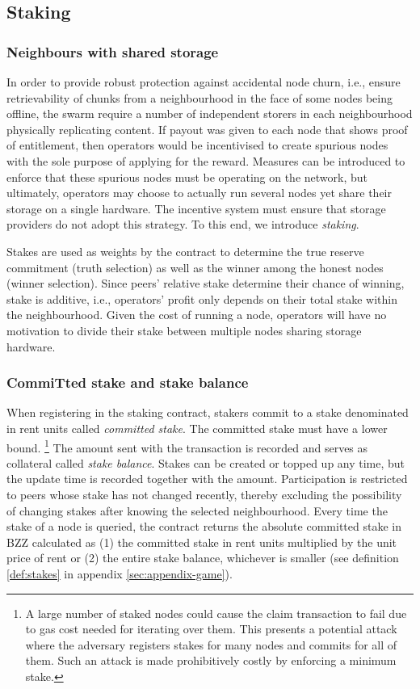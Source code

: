 \subsection{Staking}\label{sec:staking}

\subsubsection{Neighbours with shared storage}

In order to provide robust protection against accidental node churn, i.e., ensure retrievability of chunks from a neighbourhood in the face of some nodes being offline, the swarm require a number of independent storers in each neighbourhood physically replicating content.
If payout was given to each node that shows proof of entitlement, then operators would be incentivised to create spurious nodes with the sole purpose of applying for the reward. Measures can be introduced to enforce that these spurious nodes must be operating on the network, but ultimately, operators may choose to actually run several nodes yet share their storage on a single hardware. 
The incentive system must ensure that storage providers do not  adopt this strategy. To this end, we introduce \emph{staking}.  

Stakes are used as weights by the contract to determine the true reserve commitment (truth selection) as well as the winner among the honest nodes (winner selection). Since peers' relative stake determine their chance of winning, stake is additive, i.e., operators' profit only depends on their total stake within the neighbourhood. Given the cost of running a node, operators will have no  motivation to divide their stake between multiple nodes sharing storage hardware.



\subsubsection{CommiTted stake and stake balance}

When registering in the staking contract, stakers commit to a stake denominated in rent units called 
\emph{committed stake}.  The committed stake must have a lower bound.%
%
\footnote{A large number of staked nodes could cause the claim transaction to fail due to gas cost needed for iterating over them. This presents a potential attack where the adversary registers stakes for many nodes and commits for all of them. Such an attack is made prohibitively costly by enforcing a minimum stake.}
%
The  amount sent with the transaction is recorded and serves as collateral called \emph{stake balance}. Stakes can be created or topped up any time, but the update time is recorded together with the amount.
Participation is restricted to peers whose stake has not changed recently, thereby excluding the possibility of changing stakes after knowing the selected neighbourhood.
Every time the stake of a node is queried, the contract returns  the  absolute committed stake in BZZ calculated as (1) the committed stake in rent units multiplied by the unit price of rent  or (2) the entire stake balance, whichever is smaller (see definition \ref{def:stakes} in appendix \ref{sec:appendix-game}).  

